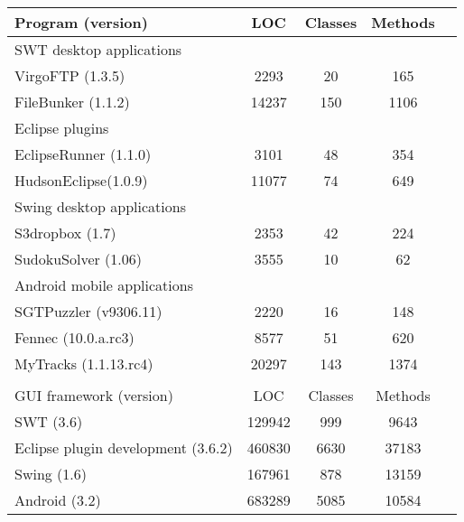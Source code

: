 \begin{table}[t]
\begin{center}
 \fontsize{9pt}{\baselineskip}\selectfont
\hspace*{-0.2cm}
\setlength{\tabcolsep}{.75\tabcolsep}
\begin{tabular}{|p{4.4cm}||c|c|c|c|}
\hline
 Program (version) & LOC & Classes & Methods \\
\hline \hline
\multicolumn{4}{|l|}{SWT desktop applications}   \\
 \hline
 VirgoFTP (1.3.5) &  2293 &  20 &  165  \\
 \hline
 FileBunker (1.1.2)&  14237 &  150 &  1106  \\
 \hline
 \hline
\multicolumn{4}{|l|}{Eclipse plugins}   \\
 \hline
 EclipseRunner (1.1.0) &  3101 &  48 &  354\\
 \hline
 HudsonEclipse(1.0.9)&  11077 &  74 &  649 \\
 \hline
 \hline
\multicolumn{4}{|l|}{Swing desktop applications}   \\
 \hline
 S3dropbox (1.7) &  2353 &  42  &  224 \\
 \hline
 SudokuSolver (1.06)&  3555 &  10 &  62 \\
 \hline
 \hline
\multicolumn{4}{|l|}{Android mobile applications}   \\
 \hline
 SGTPuzzler (v9306.11)&  2220 &  16 &  148 \\
 \hline
 Fennec (10.0.a.rc3)&  8577 &  51 &  620 \\
 \hline
 MyTracks (1.1.13.rc4)&  20297 &  143 &  1374 \\
\hline
\multicolumn{4}{l}{}   \\
\hline
 GUI framework (version) & LOC & Classes & Methods  \\
\hline \hline
 SWT (3.6)&  129942 &  999 &  9643 \\
\hline
 Eclipse plugin development (3.6.2)&  460830 &  6630 &  37183 \\
\hline
Swing (1.6)&  167961 &  878 &  13159 \\
\hline
 Android (3.2)&  683289 &  5085 &  10584 \\
\hline
\end{tabular}

\end{center}
\vspace{-15pt}
\end{table}


